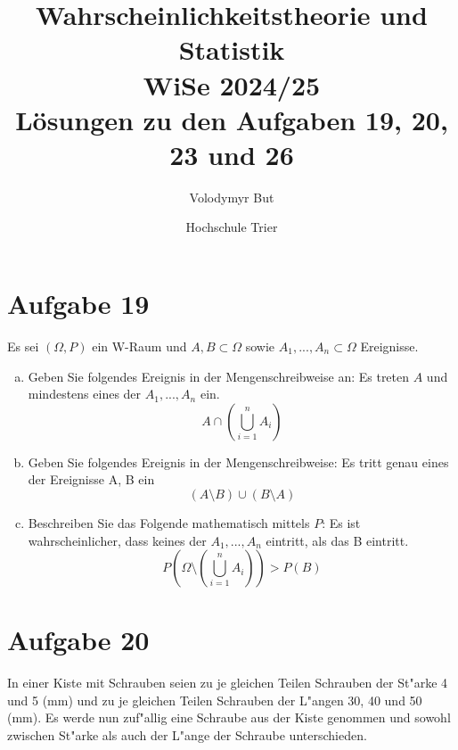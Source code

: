 \documentclass[10pt, oneside]{article}
\title{Wahrscheinlichkeitstheorie und Statistik\\[5pt]\Large WiSe 2024/25\\[15pt]\Large L{\"o}sungen zu den Aufgaben 19, 20, 23 und 26}
\author{Volodymyr But}
\date{Hochschule Trier}
\begin{document}
\sloppy

\maketitle
\vspace{25pt}

\section{Aufgabe 19}

Es sei $(\Omega, P)$ ein W-Raum und $A, B \subset \Omega$ sowie $A_1,...,A_n
\subset \Omega$ Ereignisse.

\begin{enumerate}[(a)]
    \item Geben Sie folgendes Ereignis in der Mengenschreibweise an: Es treten
        $A$ und mindestens eines der $A_1,...,A_n$ ein.
        \begin{equation*}
            A \cap \left(\bigcup_{i = 1}^nA_i\right)
        \end{equation*}
    \item Geben Sie folgendes Ereignis in der Mengenschreibweise: Es tritt genau
        eines der Ereignisse A, B ein
        \begin{equation*}
            (A \setminus B) \cup (B \setminus A)
        \end{equation*}
    \item Beschreiben Sie das Folgende mathematisch mittels $P$: Es ist
        wahrscheinlicher, dass keines der $A_1,...,A_n$ eintritt, als das B
        eintritt.
        \begin{equation*}
            P\left(\Omega \setminus \left(\bigcup_{i = 1}^nA_i\right)\right) > P(B)
        \end{equation*}
\end{enumerate}

\section{Aufgabe 20}

In einer Kiste mit Schrauben seien zu je gleichen Teilen Schrauben der St"arke
4 und 5 (mm) und zu je gleichen Teilen Schrauben der L"angen 30, 40 und 50
(mm). Es werde nun zuf"allig eine Schraube aus der Kiste genommen und sowohl
zwischen St"arke als auch der L"ange der Schraube unterschieden.
\end{document}
